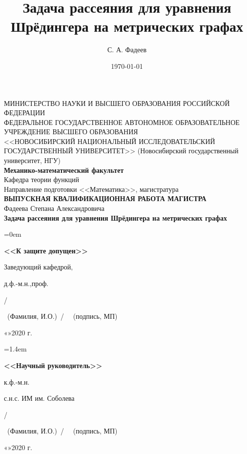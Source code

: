 \documentclass[a4 paper, 12 pt]{extarticle}
\title{Задача рассеяния для уравнения Шрёдингера на метрических графах}
\author{С. А. Фадеев}
\date{\today}
\begin{document}
	\begin{singlespacing} %
		\thispagestyle{empty} %
		\begin{center}
			\normalsize{МИНИСТЕРСТВО НАУКИ И ВЫСШЕГО ОБРАЗОВАНИЯ РОССИЙСКОЙ ФЕДЕРАЦИИ}\\
			\hfill \break
			\normalsize{ФЕДЕРАЛЬНОЕ ГОСУДАРСТВЕННОЕ АВТОНОМНОЕ ОБРАЗОВАТЕЛЬНОЕ УЧРЕЖДЕНИЕ ВЫСШЕГО ОБРАЗОВАНИЯ}\\
			\hfill \break
			\normalsize{<<НОВОСИБИРСКИЙ НАЦИОНАЛЬНЫЙ ИССЛЕДОВАТЕЛЬСКИЙ ГОСУДАРСТВЕННЫЙ УНИВЕРСИТЕТ>>}
			\normalsize{(Новосибирский государственный университет, НГУ)}\\ 
			\hfill \break
			\large{\textbf{Механико-математический факультет}}\\
			\hfill\break
			\large{Кафедра теории функций}\\
			\hfill \break
			\large{Направление подготовки <<Математика>>, магистратура}\\
			\hfill\break
			\normalsize{\textbf{ВЫПУСКНАЯ КВАЛИФИКАЦИОННАЯ РАБОТА МАГИСТРА}}\\
			\hfill \break
			\large{Фадеева Степана Александровича}\\
			\hfill \break
			\large{\textbf{Задача рассеяния для уравнения Шрёдингера на метрических графах}}\\
			\hfill \break
		\end{center}
	\end{singlespacing}
	
	\noindent
	\begin{minipage}[t]{80mm}\parindent=0em
		\large{\textbf{<<К защите допущен>>}\par
			Заведующий кафедрой,\par
			д.ф.-м.н.,проф.\par
			/\makebox[3cm]{\hrulefill}\par}
		\small{~(Фамилия, И.О.)~/~ ~(подпись, МП)}\par
		\large{«\makebox[1cm]{\hrulefill}»\makebox[4cm]{\hrulefill}2020 г.}
	\end{minipage}
	\hfill
	\begin{minipage}[t]{80mm}\parindent=1.4em
		\large{\textbf{<<Научный руководитель>>}\par
			к.ф.-м.н.\par
			с.н.с. ИМ им. Соболева\par
			/\makebox[3cm]{\hrulefill}\par}
		\small{~(Фамилия, И.О.)~/~ ~(подпись, МП)}\par
		\large{«\makebox[1cm]{\hrulefill}»\makebox[4cm]{\hrulefill}2020 г.}
	\end{minipage}
	
\end{document}
